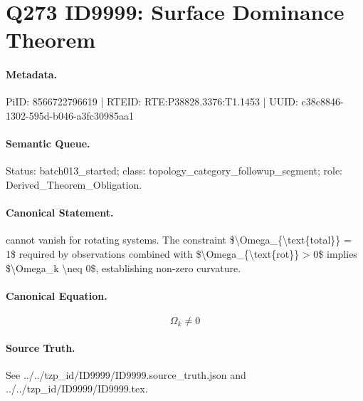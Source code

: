\section*{Q273 ID9999: Surface Dominance Theorem}
\paragraph{Metadata.}
PiID: 8566722796619 | RTEID: RTE:P38828.3376:T1.1453 | UUID: c38c8846-1302-595d-b046-a3fc30985aa1

\paragraph{Semantic Queue.}
Status: batch013\_started; class: topology\_category\_followup\_segment; role: Derived\_Theorem\_Obligation.

\paragraph{Canonical Statement.}
cannot vanish for rotating systems. The constraint \$\textbackslash{}Omega\_\{\textbackslash{}text\{total\}\} = 1\$ required by observations combined with \$\textbackslash{}Omega\_\{\textbackslash{}text\{rot\}\} > 0\$ implies \$\textbackslash{}Omega\_k \textbackslash{}neq 0\$, establishing non-zero curvature.

\paragraph{Canonical Equation.}
\[
\Omega_k \neq 0
\]

\paragraph{Source Truth.}
See ../../tzp\_id/ID9999/ID9999.source\_truth.json and ../../tzp\_id/ID9999/ID9999.tex.
